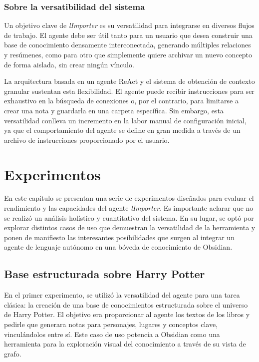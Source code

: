 \subsection{Sobre la versatibilidad del sistema}
Un objetivo clave de \textit{lImporter} es su versatilidad para integrarse en diversos flujos de trabajo. El agente debe ser útil tanto para un usuario que desea construir una base de conocimiento densamente interconectada, generando múltiples relaciones y resúmenes, como para otro que simplemente quiere archivar un nuevo concepto de forma aislada, sin crear ningún vínculo.

La arquitectura basada en un agente ReAct y el sistema de obtención de contexto granular sustentan esta flexibilidad. El agente puede recibir instrucciones para ser exhaustivo en la búsqueda de conexiones o, por el contrario, para limitarse a crear una nota y guardarla en una carpeta específica. Sin embargo, esta versatilidad conlleva un incremento en la labor manual de configuración inicial, ya que el comportamiento del agente se define en gran medida a través de un archivo de instrucciones proporcionado por el usuario.

\chapter{Experimentos}\label{chapter:implementation}
En este capítulo se presentan una serie de experimentos diseñados para evaluar el rendimiento y las capacidades del agente \textit{lImporter}. Es importante aclarar que no se realizó un análisis holístico y cuantitativo del sistema. En su lugar, se optó por explorar distintos casos de uso que demuestran la versatilidad de la herramienta y ponen de manifiesto las interesantes posibilidades que surgen al integrar un agente de lenguaje autónomo en una bóveda de conocimiento de Obsidian.

\section{Base estructurada sobre Harry Potter}
En el primer experimento, se utilizó la versatilidad del agente para una tarea clásica: la creación de una base de conocimientos estructurada sobre el universo de Harry Potter. El objetivo era proporcionar al agente los textos de los libros y pedirle que generara notas para personajes, lugares y conceptos clave, vinculándolos entre sí. Este caso de uso potencia a Obsidian como una herramienta para la exploración visual del conocimiento a través de su vista de grafo.

